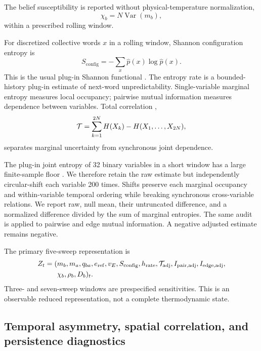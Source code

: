 \documentclass[12pt]{article}
\begin{document}
The belief susceptibility is reported without physical-temperature
normalization,
\begin{equation}
\chi_b=N\operatorname{Var}(m_b),
\end{equation}
within a prescribed rolling window.

For discretized collective words $x$ in a rolling window, Shannon
configuration
entropy is
\begin{equation}
S_{\mathrm{config}}=-\sum_x \hat p(x)\log\hat p(x).
\end{equation}
This is the usual plug-in Shannon functional \cite{shannon1948}.
The entropy rate is a bounded-history plug-in estimate of next-word
unpredictability.  Single-variable marginal entropy measures local occupancy;
pairwise mutual information measures dependence between variables.  Total
correlation \cite{watanabe1960},
\begin{equation}
{\cal T}=\sum_{k=1}^{2N}H(X_k)-H(X_1,\ldots,X_{2N}),
\end{equation}
separates marginal uncertainty from synchronous joint dependence.

The plug-in joint entropy of 32 binary variables in a short window has a large
finite-sample floor \cite{paninski2003}.  We therefore retain the raw estimate
but independently circular-shift each variable 200 times.  Shifts preserve
each marginal occupancy and within-variable temporal ordering while breaking
synchronous cross-variable relations.  We report raw, null mean, their
untruncated difference, and a normalized difference divided by the sum of
marginal entropies.  The same audit is applied to pairwise and edge mutual
information.  A negative adjusted estimate remains negative.

The primary five-sweep representation is
\begin{align}
Z_t=(&m_b,m_a,q_{ba},e_{\mathrm{ref}},v_E,S_{\mathrm{config}},h_{\mathrm{rate}},
{\cal T}_{\mathrm{adj}},I_{\mathrm{pair,adj}},I_{\mathrm{edge,adj}},\nonumber\\
&\chi_b,\rho_b,D_b)_t .
\end{align}
Three- and seven-sweep windows are prespecified sensitivities.  This is an
observable reduced representation, not a complete thermodynamic state.

\subsection{Temporal asymmetry, spatial correlation, and persistence diagnostics}
\label{sec:path-asymmetry}
\end{document}
